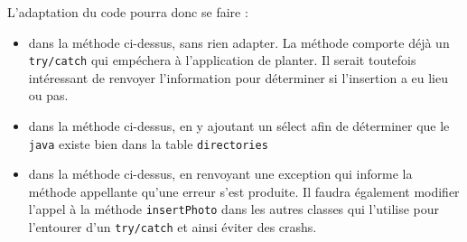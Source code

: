 \begin{enumerate}
    L'adaptation du code pourra donc se faire :
    \begin{itemize}
        \item dans la méthode ci-dessus, sans rien adapter. La méthode comporte déjà un \texttt{try/catch} qui empéchera à l'application de planter. Il serait toutefois intéressant de renvoyer l'information pour déterminer si l'insertion a eu lieu ou pas.
        \item dans la méthode ci-dessus, en y ajoutant un sélect afin de déterminer que le \texttt{java} existe bien dans la table \texttt{directories}
        \item dans la méthode ci-dessus, en renvoyant une exception qui informe la méthode appellante qu'une erreur s'est produite. Il faudra également modifier l'appel à la méthode \texttt{insertPhoto} dans les autres classes qui l'utilise pour l'entourer d'un \texttt{try/catch} et ainsi éviter des crashs.
    \end{itemize}
\end{enumerate}
